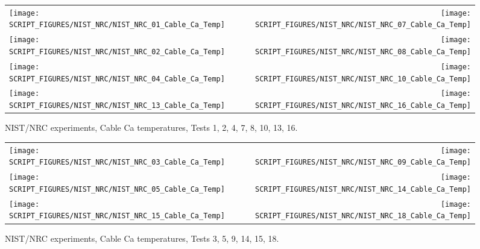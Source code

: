 \begin{figure}[p]
\begin{tabular*}{\textwidth}{l@{\extracolsep{\fill}}r}
\texttt{[image: SCRIPT\_FIGURES/NIST\_NRC/NIST\_NRC\_01\_Cable\_Ca\_Temp]} &
\texttt{[image: SCRIPT\_FIGURES/NIST\_NRC/NIST\_NRC\_07\_Cable\_Ca\_Temp]} \\
\texttt{[image: SCRIPT\_FIGURES/NIST\_NRC/NIST\_NRC\_02\_Cable\_Ca\_Temp]} &
\texttt{[image: SCRIPT\_FIGURES/NIST\_NRC/NIST\_NRC\_08\_Cable\_Ca\_Temp]} \\
\texttt{[image: SCRIPT\_FIGURES/NIST\_NRC/NIST\_NRC\_04\_Cable\_Ca\_Temp]} &
\texttt{[image: SCRIPT\_FIGURES/NIST\_NRC/NIST\_NRC\_10\_Cable\_Ca\_Temp]} \\
\texttt{[image: SCRIPT\_FIGURES/NIST\_NRC/NIST\_NRC\_13\_Cable\_Ca\_Temp]} &
\texttt{[image: SCRIPT\_FIGURES/NIST\_NRC/NIST\_NRC\_16\_Cable\_Ca\_Temp]}
\end{tabular*}
\caption{NIST/NRC experiments, Cable Ca temperatures, Tests 1, 2, 4, 7, 8, 10, 13, 16.}
\label{NIST_NRC_Cable_Ca_Closed}
\end{figure}

\begin{figure}[p]
\begin{tabular*}{\textwidth}{l@{\extracolsep{\fill}}r}
\texttt{[image: SCRIPT\_FIGURES/NIST\_NRC/NIST\_NRC\_03\_Cable\_Ca\_Temp]} &
\texttt{[image: SCRIPT\_FIGURES/NIST\_NRC/NIST\_NRC\_09\_Cable\_Ca\_Temp]} \\
\texttt{[image: SCRIPT\_FIGURES/NIST\_NRC/NIST\_NRC\_05\_Cable\_Ca\_Temp]} &
\texttt{[image: SCRIPT\_FIGURES/NIST\_NRC/NIST\_NRC\_14\_Cable\_Ca\_Temp]} \\
\texttt{[image: SCRIPT\_FIGURES/NIST\_NRC/NIST\_NRC\_15\_Cable\_Ca\_Temp]} &
\texttt{[image: SCRIPT\_FIGURES/NIST\_NRC/NIST\_NRC\_18\_Cable\_Ca\_Temp]}
\end{tabular*}
\caption{NIST/NRC experiments, Cable Ca temperatures, Tests 3, 5, 9, 14, 15, 18.}
\label{NIST_NRC_Cable_Ca_Open}
\end{figure}

